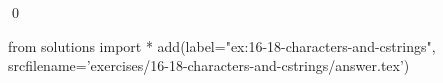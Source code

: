 
\begin{ex}
  \label{ex:16-18-characters-and-cstrings}
  
  \qed
\end{ex}
\begin{python0}
from solutions import *
add(label="ex:16-18-characters-and-cstrings",
    srcfilename='exercises/16-18-characters-and-cstrings/answer.tex')
\end{python0}
